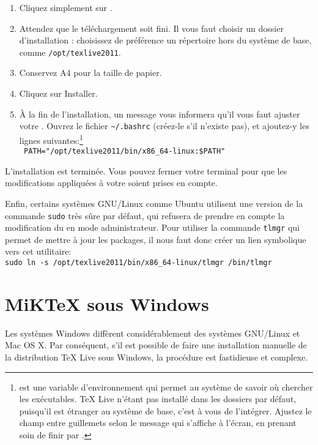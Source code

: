 \begin{enumerate}
\item Cliquez simplement sur .
\item Attendez que le téléchargement soit fini. Il vous faut choisir un dossier d'installation : choisissez de préférence un répertoire hors du système de base, comme \verb|/opt/texlive2011|.
\item Conservez A4 pour la taille de papier.
\item Cliquez sur Installer.
\item À la fin de l'installation, un message vous informera qu'il vous faut ajuster votre . Ouvrez le fichier \verb|~/.bashrc| (créez-le s'il n'existe pas), et ajoutez-y les lignes suivantes:\footnote{ est une variable d'environnement qui permet au système de savoir où chercher les exécutables. TeX Live n'étant pas installé dans les dossiers par défaut, puisqu'il est   étranger au système de base, c'est à vous de l'intégrer. Ajustez le champ entre guillemets selon le message qui s'affiche à l'écran, en prenant soin de finir par  .}\\
\verb| PATH="/opt/texlive2011/bin/x86_64-linux:$PATH"|
\end{enumerate}

L'installation est terminée. Vous pouvez fermer votre terminal pour que les modifications appliquées à votre  soient prises en compte. 

Enfin, certains systèmes GNU/Linux comme Ubuntu utilisent une version de la commande \verb|sudo| très sûre par défaut, qui refusera de prendre en compte la modification du  en mode administrateur. Pour utiliser la commande \verb|tlmgr| qui permet de mettre à jour les packages, il nous faut donc créer un lien symbolique vers cet utilitaire:\\
\verb|sudo ln -s /opt/texlive2011/bin/x86_64-linux/tlmgr /bin/tlmgr|


\section{MiKTeX sous Windows}


Les systèmes Windows diffèrent considérablement des systèmes GNU/Linux et Mac OS X. Par conséquent, s'il est possible de faire une installation manuelle de la distribution TeX Live sous Windows, la procédure est fastidieuse et complexe.

